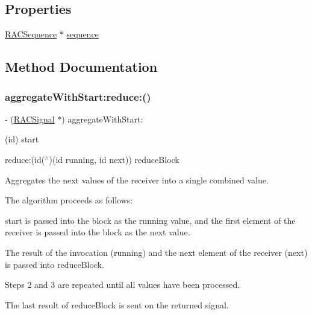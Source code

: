 \subsection*{Properties}
\begin{DoxyCompactItemize}
\item 
\mbox{\hyperlink{interface_r_a_c_sequence}{R\+A\+C\+Sequence}} $\ast$ \mbox{\hyperlink{interface_r_a_c_signal_ae580a10328d7f204c456068a2bfb5e1b}{sequence}}
\end{DoxyCompactItemize}


\subsection{Method Documentation}
\mbox{\label{interface_r_a_c_signal_a4b872b6c2322aa37f98282043e768582}} 
\subsubsection{\texorpdfstring{aggregate\+With\+Start\+:reduce\+:()}{aggregateWithStart:reduce:()}\hspace{0.1cm}{\footnotesize\ttfamily [1/3]}}
{\footnotesize\ttfamily -\/ (\mbox{\hyperlink{interface_r_a_c_signal}{R\+A\+C\+Signal}} $\ast$) aggregate\+With\+Start\+: \begin{DoxyParamCaption}\item[{(id)}]{start }\item[{reduce:(id($^\wedge$)(id running, id next))}]{reduce\+Block }\end{DoxyParamCaption}}

Aggregates the {\ttfamily next} values of the receiver into a single combined value.

The algorithm proceeds as follows\+:


\begin{DoxyEnumerate}
\item {\ttfamily start} is passed into the block as the {\ttfamily running} value, and the first element of the receiver is passed into the block as the {\ttfamily next} value.
\item The result of the invocation ({\ttfamily running}) and the next element of the receiver ({\ttfamily next}) is passed into {\ttfamily reduce\+Block}.
\item Steps 2 and 3 are repeated until all values have been processed.
\item The last result of {\ttfamily reduce\+Block} is sent on the returned signal.
\end{DoxyEnumerate}

